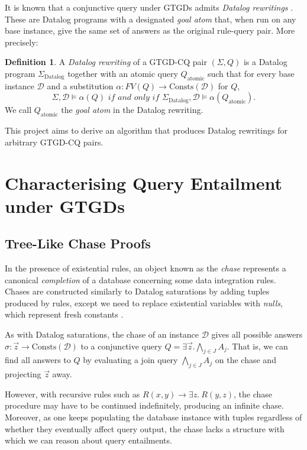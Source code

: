 \documentclass[12pt]{report}
\theoremstyle{plain}
\theoremstyle{definition}
\newtheorem{definition}[theorem]{Definition}
\def\Consts{{\mathrm{Consts}}}
\begin{document}
It is known that a conjunctive query under GTGDs admits \emph{Datalog rewritings} \cite{barany_benedikt_cate_2013}. These are Datalog programs with a designated \emph{goal atom} that, when run on any base instance, give the same set of answers as the original rule-query pair. More precisely:

\begin{definition}
  A \emph{Datalog rewriting} of a GTGD-CQ pair $(\Sigma, Q)$ is a Datalog program $\Sigma_\mathrm{Datalog}$ together with an atomic query $Q_\mathrm{atomic}$ such that for every base instance $\mathcal{D}$ and a substitution $\alpha: FV(Q) \rightarrow \Consts(\mathcal{D})$ for $Q$, $$\Sigma, \mathcal{D} \models \alpha(Q) \textit{ if and only if } \Sigma_\mathrm{Datalog}, \mathcal{D} \models \alpha(Q_\mathrm{atomic}).$$
  We call $Q_\mathrm{atomic}$ the \emph{goal atom} in the Datalog rewriting.
\end{definition}

This project aims to derive an algorithm that produces Datalog rewritings for arbitrary GTGD-CQ pairs.

\newpage
\chapter{Characterising Query Entailment under GTGDs}
\label{characterising-query-entailment-under-gtgds}

\section{Tree-Like Chase Proofs}

In the presence of existential rules, an object known as the \emph{chase} represents a canonical \emph{completion} of a database concerning some data integration rules. Chases are constructed similarly to Datalog saturations by adding tuples produced by rules, except we need to replace existential variables with \emph{nulls}, which represent fresh constants \cite{fagin_kolaitis_miller_popa_2005}.

As with Datalog saturations, the chase of an instance $\mathcal{D}$ gives all possible answers $\sigma: \vec{z} \rightarrow \Consts(\mathcal{D})$ to a conjunctive query $Q = \exists \vec{z}. \bigwedge_{j \in J} A_j$. That is, we can find all answers to $Q$ by evaluating a join query $\bigwedge_{j \in J} A_j$ on the chase and projecting $\vec{z}$ away.

However, with recursive rules such as $R(x, y) \rightarrow \exists z.\ R(y, z)$, the chase procedure may have to be continued indefinitely, producing an infinite chase. Moreover, as one keeps populating the database instance with tuples regardless of whether they eventually affect query output, the chase lacks a structure with which we can reason about query entailments.
\end{document}
